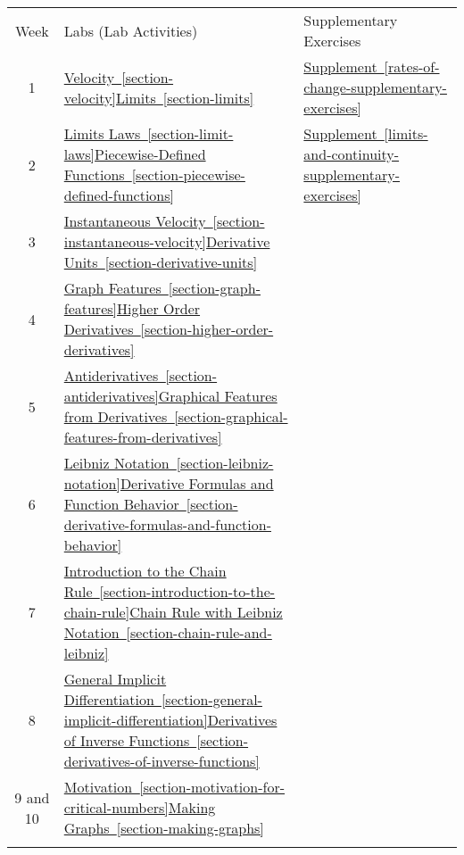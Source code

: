 \documentclass[12pt,]{book}
\theoremstyle{plain}
\theoremstyle{definition}
\numberwithin{equation}{section}
\newcommand{\hrulemedium}{\noalign{\hrule height 0.07em}}
\newcommand{\hrulethick} {\noalign{\hrule height 0.11em}}
\begin{document}
\begin{longtable}{cll}\\
\hrulethick
Week&Labs (Lab Activities)&Supplementary Exercises\\\hrulemedium
1&\hyperref[section-velocity]{Velocity~\ref*{section-velocity}}\textendash{}\hyperref[section-limits]{Limits~\ref*{section-limits}}&\hyperref[rates-of-change-supplementary-exercises]{Supplement~\ref*{rates-of-change-supplementary-exercises}}\\\hrulemedium
2&\hyperref[section-limit-laws]{Limits Laws~\ref*{section-limit-laws}}\textendash{}\hyperref[section-piecewise-defined-functions]{Piecewise-Defined Functions~\ref*{section-piecewise-defined-functions}}&\hyperref[limits-and-continuity-supplementary-exercises]{Supplement~\ref*{limits-and-continuity-supplementary-exercises}}\\\hrulemedium
3&\hyperref[section-instantaneous-velocity]{Instantaneous Velocity~\ref*{section-instantaneous-velocity}}\textendash{}\hyperref[section-derivative-units]{Derivative Units~\ref*{section-derivative-units}}&\\\hrulemedium
4&\hyperref[section-graph-features]{Graph Features~\ref*{section-graph-features}}\textendash{}\hyperref[section-higher-order-derivatives]{Higher Order Derivatives~\ref*{section-higher-order-derivatives}}&\\\hrulemedium
5&\hyperref[section-antiderivatives]{Antiderivatives~\ref*{section-antiderivatives}}\textendash{}\hyperref[section-graphical-features-from-derivatives]{Graphical Features from Derivatives~\ref*{section-graphical-features-from-derivatives}}&\\\hrulemedium
6&\hyperref[section-leibniz-notation]{Leibniz Notation~\ref*{section-leibniz-notation}}\textendash{}\hyperref[section-derivative-formulas-and-function-behavior]{Derivative Formulas and Function Behavior~\ref*{section-derivative-formulas-and-function-behavior}}&\\\hrulemedium
7&\hyperref[section-introduction-to-the-chain-rule]{Introduction to the Chain Rule~\ref*{section-introduction-to-the-chain-rule}}\textendash{}\hyperref[section-chain-rule-and-leibniz]{Chain Rule with Leibniz Notation~\ref*{section-chain-rule-and-leibniz}}&\\\hrulemedium
8&\hyperref[section-general-implicit-differentiation]{General Implicit Differentiation~\ref*{section-general-implicit-differentiation}}\textendash{}\hyperref[section-derivatives-of-inverse-functions]{Derivatives of Inverse Functions~\ref*{section-derivatives-of-inverse-functions}}&\\\hrulemedium
9 and 10&\hyperref[section-motivation-for-critical-numbers]{Motivation~\ref*{section-motivation-for-critical-numbers}}\hyperref[section-making-graphs]{Making Graphs~\ref*{section-making-graphs}}&\\\hrulethick
\end{longtable}
\setcounter{tocdepth}{1}
\renewcommand*\contentsname{Contents}
\tableofcontents
\mainmatter
\typeout{************************************************}
\typeout{************************************************}
\end{document}
